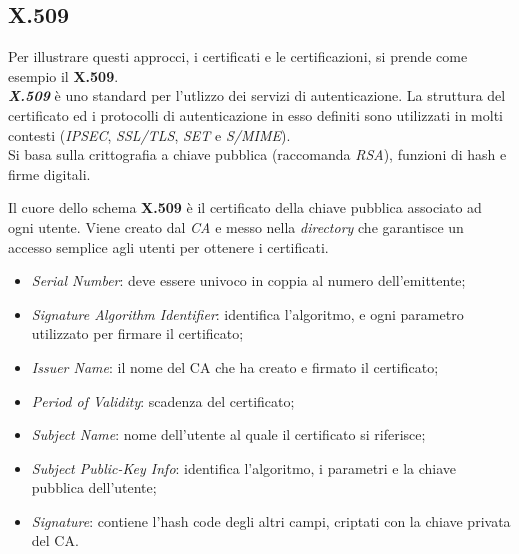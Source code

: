 \documentclass[11pt, a4paper, twoside, italian]{report}
\theoremstyle{plain}
\begin{document}
\subsection*{X.509}
Per illustrare questi approcci, i certificati e le certificazioni, si prende come esempio il \textbf{X.509}.\\
\textit{\textbf{X.509}} è uno standard per l'utlizzo dei servizi di autenticazione. La struttura del certificato ed i protocolli di autenticazione in esso definiti sono utilizzati in molti contesti (\textit{IPSEC}, \textit{SSL/TLS}, \textit{SET} e \textit{S/MIME}).\\
Si basa sulla crittografia a chiave pubblica (raccomanda \textit{RSA}), funzioni di hash e firme digitali.
\begin{multicols}{2}
	\noindent
	Il cuore dello schema \textbf{X.509} è il certificato della chiave pubblica associato ad ogni utente. Viene creato dal \textit{CA} e messo nella \textit{directory} che garantisce un accesso semplice agli utenti per ottenere i certificati.
	\begin{itemize}
		\item \textit{Serial Number}: deve essere univoco in coppia al numero dell'emittente;
		\item \textit{Signature Algorithm Identifier}: identifica l'algoritmo, e ogni parametro utilizzato per firmare il certificato;
		\item \textit{Issuer Name}: il nome del CA che ha creato e firmato il certificato;
		\item \textit{Period of Validity}: scadenza del certificato;
		\item \textit{Subject Name}: nome dell'utente al quale il certificato si riferisce;
		\item \textit{Subject Public-Key Info}: identifica l'algoritmo, i parametri e la chiave pubblica dell'utente;
		\item \textit{Signature}: contiene l'hash code degli altri campi, criptati con la chiave privata del CA.
	\end{itemize}
\columnbreak
	\begin{figure}[H]
		\centering

\end{figure}
\end{multicols}
\end{document}

